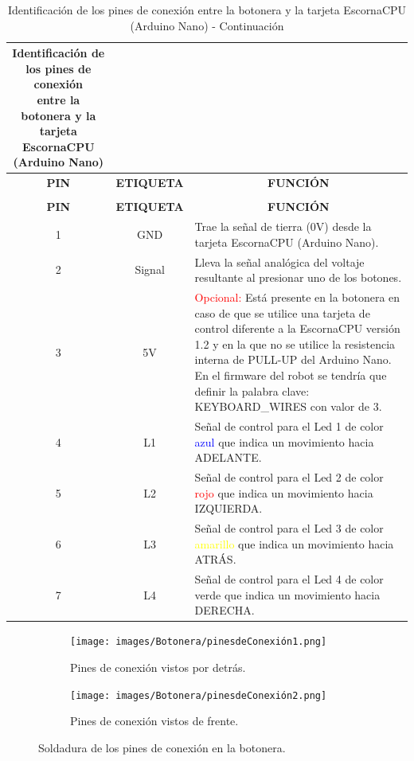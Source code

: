 \documentclass{article}
\begin{document}
\begin{longtable}{|c|c|m{}|}
    \caption{Identificación de los pines de conexión \\ entre la botonera y la tarjeta EscornaCPU (Arduino Nano)} \label{tab:pines_de_conexión} \\ \hline 
    \multicolumn{1}{|c|}{\cellcolor[HTML]{C0C0C0}\textbf{PIN}} &
    \multicolumn{1}{|c|}{\cellcolor[HTML]{C0C0C0}\textbf{ETIQUETA}} & \multicolumn{1}{c|}{\cellcolor[HTML]{C0C0C0}\textbf{FUNCIÓN}} \\ \hline 
    \endfirsthead
    \caption{Identificación de los pines de conexión entre la botonera y la tarjeta EscornaCPU (Arduino Nano) - Continuación} \\ \hline
    \multicolumn{1}{|c|}{\cellcolor[HTML]{C0C0C0}\textbf{PIN}} &
    \multicolumn{1}{|c|}{\cellcolor[HTML]{C0C0C0}\textbf{ETIQUETA}} & \multicolumn{1}{c|}{\cellcolor[HTML]{C0C0C0}\textbf{FUNCIÓN}} \\ \hline 
    \endhead
    1 & GND & Trae la señal de tierra (0V) desde la tarjeta EscornaCPU (Arduino Nano). 
    \\ \hline
    2 & Signal & Lleva la señal analógica del voltaje resultante al presionar uno de los botones.
    \\ \hline
    3 & 5V & \textcolor{red}{Opcional:} Está presente en la botonera en caso de que se utilice una tarjeta de control diferente a la EscornaCPU versión 1.2 y en la que no se utilice la resistencia interna de PULL-UP del Arduino Nano. En el firmware del robot se tendría que definir la palabra clave: KEYBOARD\_WIRES con valor de 3.
    \\ \hline
    4 & L1 & Señal de control para el Led 1 de color \textcolor{blue}{azul} que indica un movimiento hacia ADELANTE.
    \\ \hline
    5 & L2 & Señal de control para el Led 2 de color \textcolor{red}{rojo} que indica un movimiento hacia IZQUIERDA. 
    \\ \hline
    6 & L3 & Señal de control para el Led 3 de color \textcolor{yellow}{amarillo} que indica un movimiento hacia ATRÁS. 
    \\ \hline
    7 & L4 & Señal de control para el Led 4 de color \textcolor{OliveGreen}{verde} que indica un movimiento hacia DERECHA.
    \\ \hline
\end{longtable}

\begin{figure}[H]
    \centering
    \begin{subfigure}[t]{0.3\textwidth}
        \centering
        \texttt{[image: images/Botonera/pinesdeConexión1.png]}
        \caption{Pines de conexión vistos por detrás.}
        \label{fig:pines_de_conexión1}
    \end{subfigure}%
    \begin{subfigure}[t]{0.3\textwidth}
        \centering
        \texttt{[image: images/Botonera/pinesdeConexión2.png]}
        \caption{Pines de conexión vistos de frente.}
        \label{fig:pines_de_conexión2}
    \end{subfigure}
    \caption{Soldadura de los pines de conexión en la botonera.}
    \label{fig:pines_de_conexión}
\end{figure}
\end{document}
